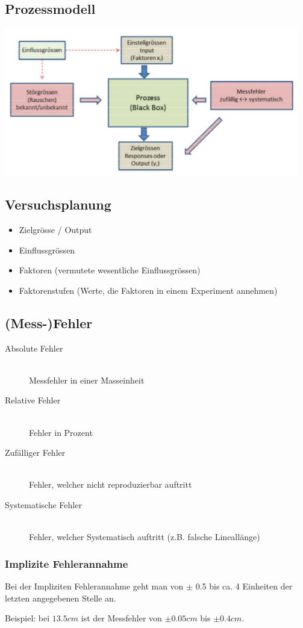 \subsection{Prozessmodell}

	\includegraphics[scale=0.75]{img/prozessmodell.png}

\subsection{Versuchsplanung}

\begin{itemize}
	\item	Zielgrösse / Output
	\item	Einflussgrössen
	\item	Faktoren (vermutete wesentliche Einflussgrössen)
	\item	Faktorenstufen (Werte, die Faktoren in einem Experiment annehmen)
\end{itemize}

\subsection{(Mess-)Fehler}

\begin{description}
	\item[Absolute Fehler] \hfill \\
		Messfehler in einer Masseinheit
	\item[Relative Fehler] \hfill \\
		Fehler in Prozent
	\item[Zufälliger Fehler] \hfill \\
		Fehler, welcher nicht reproduzierbar auftritt
	\item[Systematische Fehler] \hfill \\
		Fehler, welcher Systematisch auftritt (z.B. falsche Lineallänge)
\end{description}

\subsubsection{Implizite Fehlerannahme}

Bei der Impliziten Fehlerannahme geht man von $\pm$ 0.5 bis ca. 4 Einheiten der letzten angegebenen Stelle an.

Beispiel: bei $13.5 cm$ ist der Messfehler von $\pm 0.05 cm$ bis $\pm 0.4 cm$.


